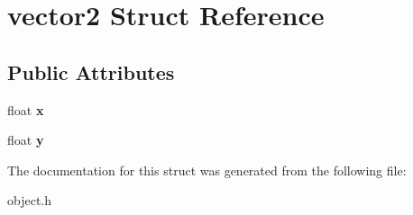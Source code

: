 \hypertarget{structvector2}{}\section{vector2 Struct Reference}
\label{structvector2}
\subsection*{Public Attributes}
\begin{DoxyCompactItemize}
\item 
\mbox{\label{structvector2_a76d1e0abcde35596481a7f9e1f30880c}} 
float {\bfseries x}
\item 
\mbox{\label{structvector2_acc316e5d28b03846f92b1757c38ae35c}} 
float {\bfseries y}
\end{DoxyCompactItemize}


The documentation for this struct was generated from the following file\+:\begin{DoxyCompactItemize}
\item 
object.\+h\end{DoxyCompactItemize}
